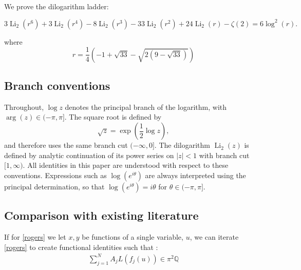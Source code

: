\documentclass[12pt]{article}
\begin{document}
\noindent We  prove the dilogarithm ladder: 

$$ 3 \operatorname{Li}_{2}(r^6) + 3 \operatorname{Li}_{2}(r^4) 
 - 8 \operatorname{Li}_{2}(r^3) - 33 \operatorname{Li}_{2}(r^2) + 24 \operatorname{Li}_{2}(r) - \zeta(2) = 
 6 \log^2(r). $$ 

\noindent where \begin{equation*}
 r=\frac{1}{4} \left( -1 + \sqrt{33} - \sqrt{2 \left(9 - \sqrt{33} \right)} \right) 
\end{equation*}




\subsection*{Branch conventions}
Throughout, $\log z$ denotes the principal branch of the logarithm, with
$\arg(z)\in(-\pi,\pi]$. The square root is defined by
\[
\sqrt{z}=\exp\!\left(\frac{1}{2}\log z\right),
\]
and therefore uses the same branch cut $(-\infty,0]$. The dilogarithm
$\operatorname{Li}_2(z)$ is defined by analytic continuation of its power
series on $|z|<1$ with branch cut $[1,\infty)$. All identities in this
paper are understood with respect to these conventions. Expressions such as $\log(e^{i\theta})$ are always
interpreted using the principal determination, so that
$\log(e^{i\theta})=i\theta$ for $\theta\in(-\pi,\pi]$.



\subsection{Comparison with existing literature}



\noindent If for \eqref{rogers} we let $x,y$ be functions of a single variable, $u$, we can iterate \eqref{rogers} to create functional identities  such that :
\begin{equation}
\begin{aligned}
\sum_{j=1}^N A_jL(f_j(u)) \in \pi^2 \mathbb{Q} 
\end{aligned}
\end{equation}
 
\end{document}
